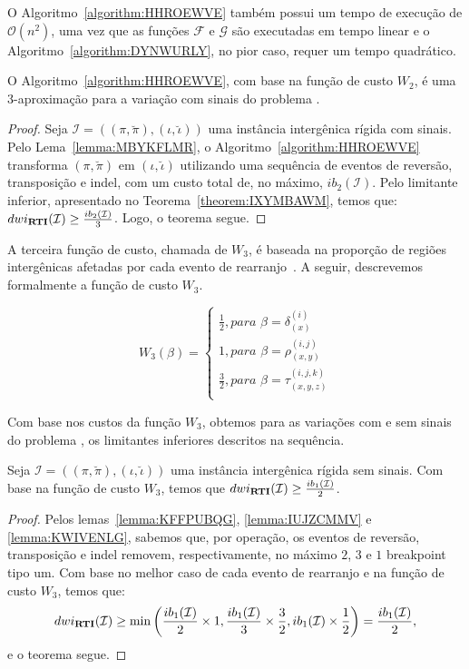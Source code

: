 O Algoritmo~\ref{algorithm:HHROEWVE} também possui um tempo de execução de $\mathcal{O}(n^2)$, uma vez que as funções $\mathcal{F}$ e $\mathcal{G}$ são executadas em tempo linear e o Algoritmo~\ref{algorithm:DYNWURLY}, no pior caso, requer um tempo quadrático.

\begin{theorem}\label{theorem:MJXOZGOO}
O Algoritmo~\ref{algorithm:HHROEWVE}, com base na função de custo $W_2$, é uma $3$-aproximação para a variação com sinais do problema \SbWIRTI{}.
\end{theorem}
\begin{proof}
Seja $\mathcal{I} = ((\pi,\breve\pi),(\iota,\breve\iota))$ uma instância intergênica rígida com sinais. Pelo Lema~\ref{lemma:MBYKFLMR}, o Algoritmo~\ref{algorithm:HHROEWVE} transforma $(\pi,\breve\pi)$ em $(\iota,\breve\iota)$ utilizando uma sequência de eventos de reversão, transposição e indel, com um custo total de, no máximo, $ib_2(\mathcal{I})$. Pelo limitante inferior, apresentado no Teorema~\ref{theorem:IXYMBAWM}, temos que: $dwi_{\textbf{RTI}}(\mathcal{I}) \ge \frac{ib_2(\mathcal{I})}{3}$. Logo, o teorema segue.
\end{proof}

A terceira função de custo, chamada de $W_3$, é baseada na proporção de regiões intergênicas afetadas por cada evento de rearranjo~\cite{2018-alexandrino-etal}. A seguir, descrevemos formalmente a função de custo $W_3$.

$$
  W_3(\beta) = \begin{cases}
      \frac{1}{2}, \textit{para } \beta = \delta_{(x)}^{(i)} \\
      1, \textit{para } \beta = \rho_{(x,y)}^{(i,j)} \\
      \frac{3}{2}, \textit{para } \beta = \tau_{(x,y,z)}^{(i,j,k)} \\
  \end{cases}
$$

Com base nos custos da função $W_3$, obtemos para as variações com e sem sinais do problema \SbWIRTI{}, os limitantes inferiores descritos na sequência.

\begin{theorem}\label{theorem:BFKDUKUF}
Seja $\mathcal{I} = ((\pi,\breve\pi),(\iota,\breve\iota))$ uma instância intergênica rígida sem sinais. Com base na função de custo $W_3$, temos que $dwi_{\textbf{RTI}}(\mathcal{I}) \ge \frac{ib_1(\mathcal{I})}{2}$.
\begin{proof}
Pelos lemas~\ref{lemma:KFFPUBQG}, \ref{lemma:IUJZCMMV} e \ref{lemma:KWIVENLG}, sabemos que, por operação, os eventos de reversão, transposição e indel removem, respectivamente, no máximo $2$, $3$ e $1$ breakpoint tipo um. Com base no melhor caso de cada evento de rearranjo e na função de custo $W_3$, temos que:
$$dwi_{\textbf{RTI}}(\mathcal{I}) \ge \min\left(\frac{ib_1(\mathcal{I})}{2} \times 1,\frac{ib_1(\mathcal{I})}{3} \times \frac{3}{2}, ib_1(\mathcal{I}) \times \frac{1}{2}\right) = \frac{ib_1(\mathcal{I})}{2},$$ e o teorema segue.
\end{proof}
\end{theorem}

